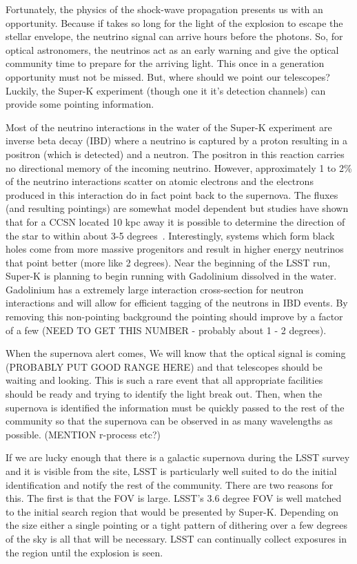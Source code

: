 \documentclass[11pt]{article}
\newcommand{\superk}  {Super\nobreakdash-K\xspace}
\begin{document}
Fortunately, the physics of the shock-wave propagation presents us
with an opportunity.  Because if takes so long for the light of the
explosion to escape the stellar envelope, the neutrino signal can
arrive hours before the photons. So, for optical astronomers, the
neutrinos act as an early warning and give the optical community time
to prepare for the arriving light.  This once in a generation
opportunity must not be missed. But, where should we point our
telescopes?  Luckily, the \superk experiment (though one it
it's detection channels) can provide some pointing information.

Most of the neutrino interactions in the water of the \superk
experiment are inverse beta decay (IBD) where a neutrino is captured
by a proton resulting in a positron (which is detected) and a neutron.
The positron in this reaction carries no directional memory of the
incoming neutrino.  However, approximately 1 to 2\% of the neutrino
interactions scatter on atomic electrons and the electrons produced in
this interaction do in fact point back to the supernova.  The fluxes
(and resulting pointings) are somewhat model dependent but studies
have shown that for a CCSN located 10 kpc away it is possible to
determine the direction of the star to within about 3-5
degrees~\cite{2016APh....81...39A}.  Interestingly, systems which form black
holes come from more massive progenitors and result in higher energy
neutrinos that point better (more like 2 degrees).  Near the beginning
of the LSST run, \superk is planning to begin running with
Gadolinium dissolved in the water.  Gadolinium has a extremely large
interaction cross-section for neutron interactions and will allow for
efficient tagging of the neutrons in IBD events.  By removing this
non-pointing background the pointing should improve by a factor of a
few (NEED TO GET THIS NUMBER - probably about 1 - 2 degrees).

When the supernova alert comes,  We will know that the optical signal
is coming (PROBABLY PUT GOOD RANGE HERE) and that telescopes should be
waiting and looking.  This is such a rare event that all appropriate
facilities should be ready and trying to identify the light break
out.  Then, when the supernova is identified the information must be
quickly passed to the rest of the community so that the supernova can
be observed in as many wavelengths as possible. (MENTION r-process etc?)

If we are lucky enough that there is a galactic supernova during the
LSST survey and it is visible from the site, LSST is particularly well
suited to do the initial identification and notify the rest of the
community.  There are two reasons for this.  The first is that the FOV
is large. LSST's 3.6 degree FOV is well matched to the initial search
region that would be presented by \superk.  Depending on the
size either a single pointing or a tight pattern of dithering over a
few degrees of the sky is all that will be necessary.  LSST can
continually collect exposures in the region until the explosion is
seen.
\end{document}
